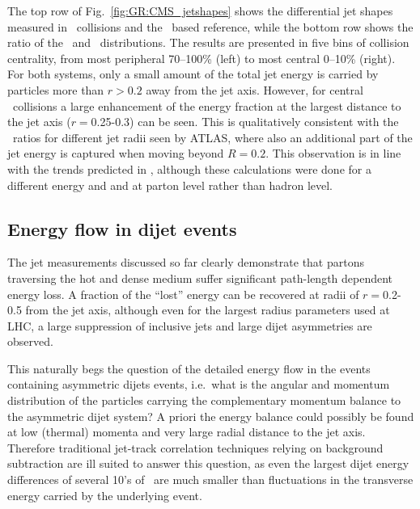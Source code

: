 The top row of Fig.~\ref{fig:GR:CMS_jetshapes} shows the differential jet shapes measured in \PbPb\
collisions and the \pp\ based reference, while the bottom row shows the ratio of the \PbPb\ and \pp\
distributions. The results are presented in five bins of collision centrality, from
most peripheral 70--100\% (left) to most central 0--10\% (right). For
both systems, only a small amount of the total jet energy
is carried by particles more than  $r> 0.2$ away from the jet axis. However, for central
\PbPb\ collisions a large enhancement of the energy fraction at the largest distance
to the jet axis ($r = $0.25-0.3) can be seen.
This is qualitatively consistent with the \Rcp\ ratios for different jet radii seen by ATLAS,
where also an additional part of the jet energy is captured when moving beyond $R = 0.2$.
This observation is in line with the trends predicted in
\cite{Vitev:2008rz,Renk:2009hv}, although these calculations were
done for a different energy and and at parton level rather than hadron level.

\subsection{Energy flow in dijet events}

The jet measurements discussed so far clearly demonstrate that partons traversing the hot and dense
medium suffer significant path-length dependent energy loss. A fraction of the ``lost'' energy
can be recovered at radii of $r=$0.2-0.5 from the jet axis, although even for the largest radius
parameters used at LHC, a large suppression of inclusive jets and large dijet asymmetries are
observed.

This naturally begs the question of the detailed energy flow in the events containing asymmetric
dijets events, i.e.\ what is the angular and momentum distribution of the particles carrying
the complementary momentum balance to the asymmetric dijet system? A priori the energy balance
could possibly be found at low (thermal) momenta and very large radial distance to the jet axis.
Therefore traditional jet-track correlation techniques relying on background subtraction are ill suited
to answer this question, as even the largest dijet energy differences of several 10's of \GeV\
are much smaller than fluctuations in the transverse energy carried by the underlying event.

